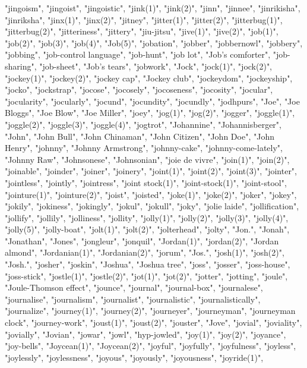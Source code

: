 "jingoism",
"jingoist",
"jingoistic",
"jink(1)",
"jink(2)",
"jinn",
"jinnee",
"jinrikisha",
"jinriksha",
"jinx(1)",
"jinx(2)",
"jitney",
"jitter(1)",
"jitter(2)",
"jitterbug(1)",
"jitterbug(2)",
"jitteriness",
"jittery",
"jiu-jitsu",
"jive(1)",
"jive(2)",
"job(1)",
"job(2)",
"job(3)",
"job(4)",
"Job(5)",
"jobation",
"jobber",
"jobbernowl",
"jobbery",
"jobbing",
"job-control language",
"job-hunt",
"job lot",
"Job's comforter",
"job-sharing",
"job-sheet",
"Job's tears",
"jobwork",
"Jock",
"jock(1)",
"jock(2)",
"jockey(1)",
"jockey(2)",
"jockey cap",
"Jockey club",
"jockeydom",
"jockeyship",
"jocko",
"jockstrap",
"jocose",
"jocosely",
"jocoseness",
"jocosity",
"jocular",
"jocularity",
"jocularly",
"jocund",
"jocundity",
"jocundly",
"jodhpurs",
"Joe",
"Joe Bloggs",
"Joe Blow",
"Joe Miller",
"joey",
"jog(1)",
"jog(2)",
"jogger",
"joggle(1)",
"joggle(2)",
"joggle(3)",
"joggle(4)",
"jogtrot",
"Johannine",
"Johannisberger",
"John",
"John Bull",
"John Chinaman",
"John Citizen",
"John Doe",
"John Henry",
"johnny",
"Johnny Armstrong",
"johnny-cake",
"johnny-come-lately",
"Johnny Raw",
"Johnsonese",
"Johnsonian",
"joie de vivre",
"join(1)",
"join(2)",
"joinable",
"joinder",
"joiner",
"joinery",
"joint(1)",
"joint(2)",
"joint(3)",
"jointer",
"jointless",
"jointly",
"jointress",
"joint stock(1)",
"joint-stock(1)",
"joint-stool",
"jointure(1)",
"jointure(2)",
"joist",
"joisted",
"joke(1)",
"joke(2)",
"joker",
"jokey",
"jokily",
"jokiness",
"jokingly",
"jokul",
"jokull",
"joky",
"jolie laide",
"jollification",
"jollify",
"jollily",
"jolliness",
"jollity",
"jolly(1)",
"jolly(2)",
"jolly(3)",
"jolly(4)",
"jolly(5)",
"jolly-boat",
"jolt(1)",
"jolt(2)",
"jolterhead",
"jolty",
"Jon.",
"Jonah",
"Jonathan",
"Jones",
"jongleur",
"jonquil",
"Jordan(1)",
"jordan(2)",
"Jordan almond",
"Jordanian(1)",
"Jordanian(2)",
"jorum",
"Jos.",
"josh(1)",
"josh(2)",
"Josh.",
"josher",
"joskin",
"Joshua",
"Joshua tree",
"joss",
"josser",
"joss-house",
"joss-stick",
"jostle(1)",
"jostle(2)",
"jot(1)",
"jot(2)",
"jotter",
"jotting",
"joule",
"Joule-Thomson effect",
"jounce",
"journal",
"journal-box",
"journalese",
"journalise",
"journalism",
"journalist",
"journalistic",
"journalistically",
"journalize",
"journey(1)",
"journey(2)",
"journeyer",
"journeyman",
"journeyman clock",
"journey-work",
"joust(1)",
"joust(2)",
"jouster",
"Jove",
"jovial",
"joviality",
"jovially",
"Jovian",
"jowar",
"jowl",
"hyp-jowled",
"joy(1)",
"joy(2)",
"joyance",
"joy-bells",
"Joycean(1)",
"Joycean(2)",
"joyful",
"joyfully",
"joyfulness",
"joyless",
"joylessly",
"joylessness",
"joyous",
"joyously",
"joyousness",
"joyride(1)",
